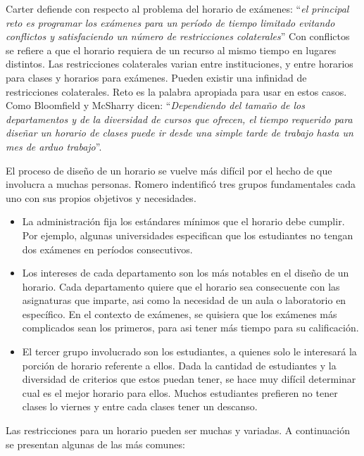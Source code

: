 Carter defiende con respecto al problema del horario de exámenes: ``\emph{el principal reto es programar los
exámenes para un período de tiempo limitado evitando conflictos y satisfaciendo un número de restricciones
colaterales}'' \cite{Carter's summary} Con conflictos se refiere a que el horario requiera de un recurso
al mismo tiempo en lugares distintos. Las restricciones colaterales varian entre instituciones, y entre
horarios para clases y horarios para exámenes. Pueden existir una infinidad de restricciones colaterales.
Reto es la palabra apropiada para usar en estos casos.
Como Bloomfield y McSharry dicen: ``\emph{Dependiendo del tamaño de los departamentos y de la diversidad
de cursos que ofrecen, el tiempo requerido para diseñar un horario de clases puede ir desde una simple
tarde de trabajo hasta un mes de arduo trabajo}''. \cite{Bloomfield and McSharry says}

El proceso de diseño de un horario se vuelve más difícil por el hecho de que involucra a muchas personas.
Romero indentificó tres grupos fundamentales cada uno con sus propios objetivos y necesidades. \cite{Romero}

\begin{itemize}
	\item La administración fija los estándares  mínimos que el horario debe cumplir. Por ejemplo, algunas
		universidades especifican que los estudiantes no tengan dos exámenes en períodos consecutivos.
	\item Los intereses de cada departamento son los más notables en el diseño de un horario. Cada departamento
		quiere que el horario sea consecuente con las asignaturas que imparte, asi como la necesidad de un
		aula o laboratorio en específico. En el contexto de exámenes, se quisiera que los exámenes más complicados
		sean los primeros, para asi tener más tiempo para su calificación.
	\item El tercer grupo involucrado son los estudiantes, a quienes solo le interesará la porción de horario
		referente a ellos. Dada la cantidad de estudiantes y la diversidad de criterios que estos puedan tener,
		se hace muy difícil determinar cual es el mejor horario para ellos. Muchos estudiantes prefieren no
		tener clases lo viernes y entre cada clases tener un descanso.		
\end{itemize}

Las restricciones para un horario pueden ser muchas y variadas. A continuación se presentan algunas de 
las más comunes:

